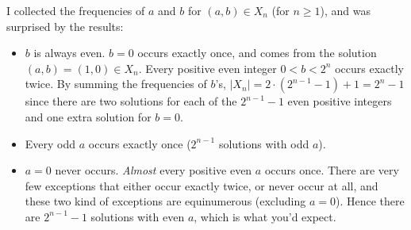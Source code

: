 \documentclass[1gpt]{article}
\theoremstyle{break}
\begin{document}
I collected the frequencies of $a$ and $b$ for $(a, b) \in X_n$ (for $n \geq
1$), and was surprised by the results:

\begin{itemize}

    \item

        $b$ is always even. $b = 0$ occurs exactly once, and comes from the
        solution $(a, b) = (1, 0) \in X_n$. Every positive even integer $0 < b
        < 2^n$ occurs exactly twice. By summing the frequencies of $b$'s,
        $|X_n| = 2 \cdot (2^{n-1} - 1) + 1 = 2^n - 1$ since there are two
        solutions for each of the $2^{n-1} - 1$ even positive integers and one
        extra solution for $b=0$.

    \item

        Every odd $a$ occurs exactly once ($2^{n-1}$ solutions with odd $a$).

    \item

        $a=0$ never occurs. \textit{Almost} every positive even $a$ occurs
        once. There are very few exceptions that either occur exactly twice, or
        never occur at all, and these two kind of exceptions are equinumerous
        (excluding $a=0$). Hence there are $2^{n-1}-1$ solutions with even $a$,
        which is what you'd expect.



\end{itemize}
\end{document}
